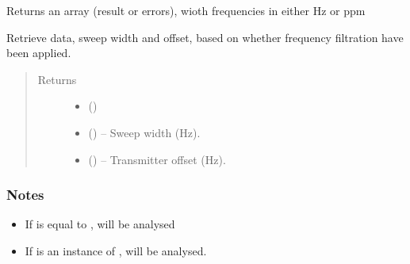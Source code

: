 \documentclass[letterpaper,10pt,english]{sphinxmanual}
\begin{document}
\begin{fulllineitems}
\begin{fulllineitems}
\label{\detokenize{references/core:nmrespy.core.Estimator._get_array}}
\sphinxAtStartPar
Returns an array (result or errors), wioth frequencies in either
Hz or ppm

\end{fulllineitems}


\begin{fulllineitems}
\label{\detokenize{references/core:nmrespy.core.Estimator._get_data_sw_offset}}
\sphinxAtStartPar
Retrieve data, sweep width and offset, based on whether
frequency filtration have been applied.
\begin{quote}\begin{description}
\item[{Returns}] \leavevmode
\sphinxAtStartPar
\begin{itemize}
\item {} 
\sphinxAtStartPar
{} ()

\item {} 
\sphinxAtStartPar
{} () – Sweep width (Hz).

\item {} 
\sphinxAtStartPar
{} () – Transmitter offset (Hz).

\end{itemize}


\end{description}\end{quote}
\subsubsection*{Notes}
\begin{itemize}
\item {} 
\sphinxAtStartPar
If  is equal to ,  will be
analysed

\item {} 
\sphinxAtStartPar
If  is an instance of
{\hyperref[\detokenize{references/freqfilter:nmrespy.freqfilter.FrequencyFilter}]{}},
 will be analysed.


\end{itemize}
\end{fulllineitems}
\end{fulllineitems}
\end{document}
